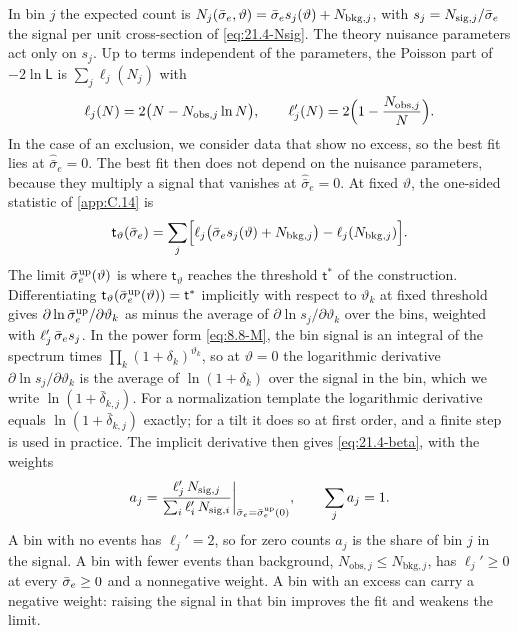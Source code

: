 In bin $j$ the expected count is $N_j(\bar{\sigma}_{e},\vartheta) = \bar{\sigma}_{e} s_j(\vartheta) + N_{\mathrm{bkg},j}$, with $s_j = N_{\mathrm{sig},j}/\bar{\sigma}_{e}$ the signal per unit cross-section of \cref{eq:21.4-Nsig}. The theory nuisance parameters act only on $s_j$. Up to terms independent of the parameters, the Poisson part of $-2\ln\mathsf{L}$ is $\sum_j\ell_j(N_j)$ with
\begin{equation*}
  \ell_j(N) = 2\bigl(N - N_{\mathrm{obs},j}\ln N\bigr) , \qquad \ell_j'(N) = 2\Bigl(1 - \frac{N_{\mathrm{obs},j}}{N}\Bigr) .
\end{equation*}
In the case of an exclusion, we consider data that show no excess, so the best fit lies at $\hat{\bar\sigma}_e = 0$. The best fit then does not depend on the nuisance parameters, because they multiply a signal that vanishes at $\hat{\bar\sigma}_e = 0$. At fixed $\vartheta$, the one-sided statistic of \cref{app:C.14} is
\begin{equation}
  \mathsf{t}_\vartheta(\bar{\sigma}_{e}) = \sum_j\Bigl[\ell_j\bigl(\bar{\sigma}_{e} s_j(\vartheta) + N_{\mathrm{bkg},j}\bigr) - \ell_j(N_{\mathrm{bkg},j})\Bigr] .
  \label{eq:D.47-tfix}
\end{equation}
The limit $\bar{\sigma}_{e}^{\mathrm{up}}(\vartheta)$ is where $\mathsf{t}_\vartheta$ reaches the threshold $\mathsf{t}^*$ of the construction. Differentiating $\mathsf{t}_\vartheta(\bar{\sigma}_{e}^{\mathrm{up}}(\vartheta)) = \mathsf{t}^*$ implicitly with respect to $\vartheta_k$ at fixed threshold gives $\partial\ln\bar{\sigma}_{e}^{\mathrm{up}}/\partial\vartheta_k$ as minus the average of $\partial\ln s_j/\partial\vartheta_k$ over the bins, weighted with $\ell_j'\,\bar{\sigma}_{e} s_j$.
In the power form \cref{eq:8.8-M}, the bin signal is an integral of the spectrum times $\prod_k(1 + \delta_k)^{\vartheta_k}$, so at $\vartheta = 0$ the logarithmic derivative $\partial\ln s_j/\partial\vartheta_k$ is the average of $\ln(1 + \delta_k)$ over the signal in the bin, which we write $\ln(1 + \bar\delta_{k,j})$. For a normalization template the logarithmic derivative equals $\ln(1 + \bar\delta_{k,j})$ exactly; for a tilt it does so at first order, and a finite step is used in practice. The implicit derivative then gives \cref{eq:21.4-beta}, with the weights
\begin{equation}
  a_j = \frac{\ell_j'\,N_{\mathrm{sig},j}}{\sum_i\ell_i'\,N_{\mathrm{sig},i}}\bigg|_{\bar{\sigma}_{e} = \bar{\sigma}_{e}^{\mathrm{up}}(0)} , \qquad \sum_ja_j = 1 .
  \label{eq:D.47-weights}
\end{equation}
A bin with no events has $\ell_j' = 2$, so for zero counts $a_j$ is the share of bin $j$ in the signal. A bin with fewer events than background, $N_{\mathrm{obs},j} \le N_{\mathrm{bkg},j}$, has $\ell_j' \ge 0$ at every $\bar{\sigma}_{e} \ge 0$ and a nonnegative weight. A bin with an excess can carry a negative weight: raising the signal in that bin improves the fit and weakens the limit.


